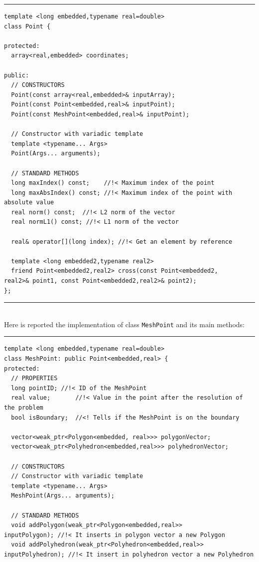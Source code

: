 \noindent\rule{12.7cm}{1pt}
\begin{lstlisting}[caption=File \texttt{Point.h}]
template <long embedded,typename real=double>
class Point {

protected:
  array<real,embedded> coordinates;

public:
  // CONSTRUCTORS
  Point(const array<real,embedded>& inputArray);
  Point(const Point<embedded,real>& inputPoint);
  Point(const MeshPoint<embedded,real>& inputPoint);

  // Constructor with variadic template
  template <typename... Args>
  Point(Args... arguments);

  // STANDARD METHODS
  long maxIndex() const;	//!< Maximum index of the point
  long maxAbsIndex() const;	//!< Maximum index of the point with absolute value
  real norm() const;  //!< L2 norm of the vector
  real normL1() const; //!< L1 norm of the vector

  real& operator[](long index);	//!< Get an element by reference

  template <long embedded2,typename real2>
  friend Point<embedded2,real2> cross(const Point<embedded2,
real2>& point1, const Point<embedded2,real2>& point2);
};
\end{lstlisting}

\noindent\rule{12.7cm}{1pt}\\

Here is reported the implementation of class \verb|MeshPoint| and its main methods:\\

\noindent\rule{12.7cm}{1pt}
\begin{lstlisting}[caption=File \texttt{MeshPoint.h}]
template <long embedded,typename real=double>
class MeshPoint: public Point<embedded,real> {
protected:
  // PROPERTIES
  long pointID;	//!< ID of the MeshPoint
  real value;		//!< Value in the point after the resolution of the problem
  bool isBoundary;	//<! Tells if the MeshPoint is on the boundary

  vector<weak_ptr<Polygon<embedded, real>>> polygonVector;
  vector<weak_ptr<Polyhedron<embedded,real>>> polyhedronVector;

  // CONSTRUCTORS
  // Constructor with variadic template
  template <typename... Args>
  MeshPoint(Args... arguments);

  // STANDARD METHODS
  void addPolygon(weak_ptr<Polygon<embedded,real>> 
inputPolygon); //!< It inserts in polygon vector a new Polygon
  void addPolyhedron(weak_ptr<Polyhedron<embedded,real>> 
inputPolyhedron); //!< It insert in polyhedron vector a new Polyhedron
\end{lstlisting}

